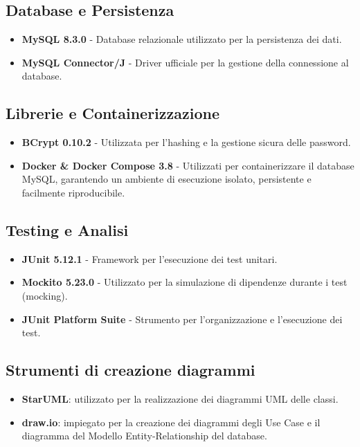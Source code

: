 \documentclass[a4paper,11pt]{article}
\begin{document}
\subsection{Database e Persistenza}
\begin{itemize}
    \item \textbf{MySQL 8.3.0} - Database relazionale utilizzato per la persistenza dei dati.
    \item \textbf{MySQL Connector/J} - Driver ufficiale per la gestione della connessione al database.
\end{itemize}

\subsection{Librerie e Containerizzazione}
\begin{itemize}
    \item \textbf{BCrypt 0.10.2} - Utilizzata per l'hashing e la gestione sicura delle password.
    \item \textbf{Docker \& Docker Compose 3.8} - Utilizzati per containerizzare il database MySQL, garantendo un ambiente di esecuzione isolato, persistente e facilmente riproducibile.
\end{itemize}

\subsection{Testing e Analisi}
\begin{itemize}
    \item \textbf{JUnit 5.12.1} - Framework per l'esecuzione dei test unitari.
    \item \textbf{Mockito 5.23.0} - Utilizzato per la simulazione di dipendenze durante i test (mocking).
    \item \textbf{JUnit Platform Suite} - Strumento per l'organizzazione e l'esecuzione dei test.
\end{itemize}


\subsection{Strumenti di creazione diagrammi}
\begin{itemize}
	\item \textbf{StarUML}: utilizzato per la realizzazione dei diagrammi UML delle classi.
	\item \textbf{draw.io}: impiegato per la creazione dei diagrammi degli Use Case e il diagramma del Modello Entity-Relationship del database.
\end{itemize}
\end{document}
